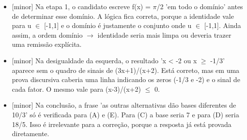 \documentclass{article}%
\begin{document}
\begin{itemize}%
\item%
{[}minor{]} Na etapa 1, o candidato escreve f(x) = $\pi$/2 'em todo o domínio' antes de determinar esse domínio. A lógica fica correta, porque a identidade vale para u $\in$ {[}-1,1{]} e o domínio é justamente o conjunto onde u $\in$ {[}-1,1{]}. Ainda assim, a ordem domínio $\to$ identidade seria mais limpa ou deveria trazer uma remissão explícita.%
\item%
{[}minor{]} Na desigualdade da esquerda, o resultado 'x < -2 ou x $\geq$ -1/3' aparece sem o quadro de sinais de (3x+1)/(x+2). Está correto, mas em uma prova discursiva caberia uma linha indicando os zeros (-1/3 e -2) e o sinal de cada fator. O mesmo vale para (x-3)/(x+2) $\leq$ 0.%
\item%
{[}minor{]} Na conclusão, a frase 'as outras alternativas dão bases diferentes de 10/3' só é verificada para (A) e (E). Para (C) a base seria 7 e para (D) seria 18/5. Isso é irrelevante para a correção, porque a resposta já está provada diretamente.%
\end{itemize}%
\end{document}
